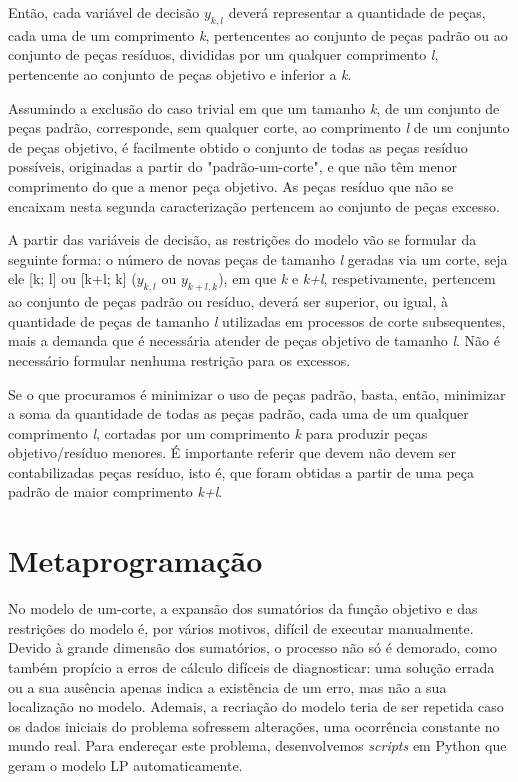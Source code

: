 \documentclass[12pt, a4paper, titlepage]{article}
\begin{document}
Então, cada variável de decisão \textit{$y_{k,l}$} deverá representar a quantidade de peças, cada
uma de um comprimento \textit{k}, pertencentes ao conjunto de peças padrão ou ao conjunto de peças
resíduos, divididas por um qualquer comprimento \textit{l}, pertencente ao conjunto de peças
objetivo e inferior a \textit{k}.

Assumindo a exclusão do caso trivial em que um tamanho \textit{k}, de um conjunto de peças padrão,
corresponde, sem qualquer corte, ao comprimento \textit{l} de um conjunto de peças objetivo, é
facilmente obtido o conjunto de todas as peças resíduo possíveis, originadas a partir do
"padrão-um-corte", e que não têm menor comprimento do que a menor peça objetivo. As peças resíduo
que não se encaixam nesta segunda caracterização pertencem ao conjunto de peças excesso.

A partir das variáveis de decisão, as restrições do modelo vão se formular da seguinte forma: o
número de novas peças de tamanho \textit{l} geradas via um corte, seja ele [k; l] ou [k+l; k]
(\textit{$y_{k,l}$} ou \textit{$y_{k+l,k}$}), em que \textit{k} e \textit{k+l}, respetivamente,
pertencem ao conjunto de peças padrão ou resíduo, deverá ser superior, ou igual, à quantidade de
peças de tamanho \textit{l} utilizadas em processos de corte subsequentes, mais a demanda que é
necessária atender de peças objetivo de tamanho \textit{l}. Não é necessário formular nenhuma
restrição para os excessos.

Se o que procuramos é minimizar o uso de peças padrão, basta, então, minimizar a soma da quantidade
de todas as peças padrão, cada uma de um qualquer comprimento \textit{l}, cortadas por um
comprimento \textit{k} para produzir peças objetivo/resíduo menores. É importante referir que devem
não devem ser contabilizadas peças resíduo, isto é, que foram obtidas a partir de uma peça padrão de
maior comprimento \textit{k+l}.

\section{Metaprogramação}

No modelo de um-corte, a expansão dos sumatórios da função objetivo e das restrições do modelo é,
por vários motivos, difícil de executar manualmente. Devido à grande dimensão dos sumatórios, o
processo não só é demorado, como também propício a erros de cálculo difíceis de diagnosticar: uma
solução errada ou a sua ausência apenas indica a existência de um erro, mas não a sua localização
no modelo. Ademais, a recriação do modelo teria de ser repetida caso os dados iniciais do problema
sofressem alterações, uma ocorrência constante no mundo real. Para endereçar este problema,
desenvolvemos \emph{scripts} em Python que geram o modelo LP automaticamente.
\end{document}
